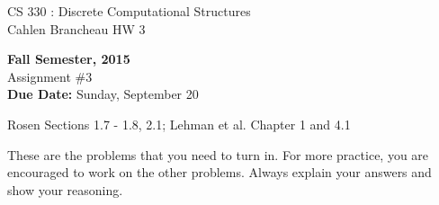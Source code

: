 \documentclass[12pt]{article}
\begin{document}
\begin{center}
{{\large CS 330 : Discrete Computational Structures}}\\
Cahlen Brancheau HW 3

{\bf Fall Semester, 2015}\\

{\sc Assignment \#3}\\
{\bf Due Date:}  Sunday, September 20
\end{center}

 Rosen Sections 1.7 - 1.8, 2.1; Lehman et al. Chapter 1 and 4.1

These are the problems that you need to turn in. For more
practice, you are encouraged to work on the other problems. Always
explain your answers and show your reasoning.
\end{document}
